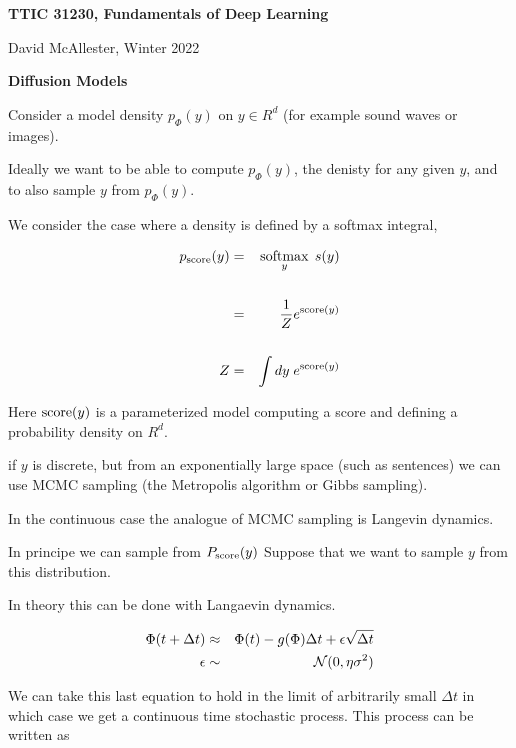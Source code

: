 




{\Huge

  \centerline{\bf TTIC 31230, Fundamentals of Deep Learning}
  \bigskip
  \centerline{David McAllester, Winter 2022}
  \vfill
  \vfill
  \centerline{\bf Diffusion Models}
  \vfill
  \vfill


Consider a model density $p_\Phi(y)$ on $y \in R^d$ (for example sound waves or images).

\vfill
Ideally we want to be able to compute $p_\Phi(y)$, the denisty for any given $y$, and to also sample $y$ from $p_\Phi(y)$.


We consider the case where a density is defined by a softmax integral,

\vfill
\begin{eqnarray*}
  p_{\mathrm{score}}(y) & = & \operatorname*{softmax}_y\; s(y) \\
  \\
  & = & \frac{1}{Z} e^{\mathrm{score}(y)} \\
  \\
  Z & = & \int dy\;e^{\mathrm{score}(y)}
\end{eqnarray*}

\vfill
Here $\mathrm{score}(y)$ is a parameterized model computing a score and defining a probability density on $R^d$.

\vfill
if $y$ is discrete, but from an exponentially large space (such as sentences) we can use MCMC sampling
(the Metropolis algorithm or Gibbs sampling).

\vfill
In the continuous case the analogue of MCMC sampling is Langevin dynamics.


\vfill
In principe we can sample from $P_{\mathrm{score}}(y)$
\vfill
Suppose that we want to sample $y$ from this distribution.

\vfill
In theory this can be done with Langaevin dynamics.

\begin{eqnarray*}
\Phi(t + \Delta t) & \approx & \Phi(t) -g(\Phi)\Delta t +  \epsilon \sqrt{\Delta t} \\
\epsilon & \sim & {\cal N}(0,\eta\sigma^2)
\end{eqnarray*}

\vfill
We can take this last equation to hold in the limit of arbitrarily small $\Delta t$ in which case we get a continuous time stochastic process.  This process can be written as

}
